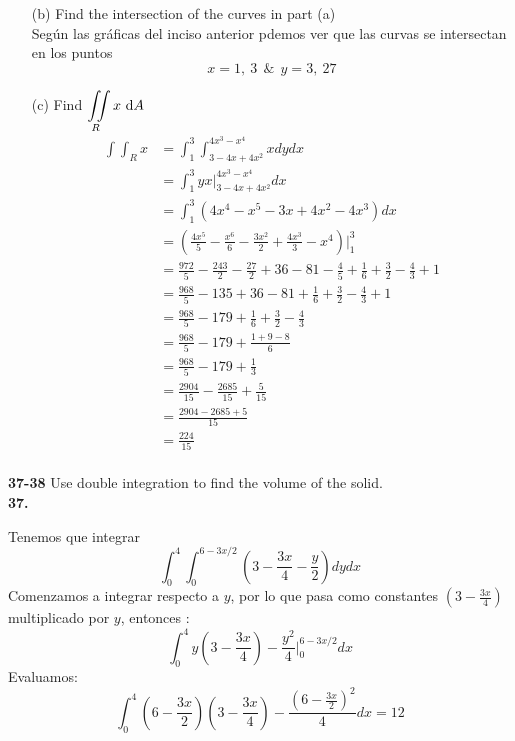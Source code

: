 \documentclass[11pt]{report}
\begin{document}
\begin{itemize}
	\item[(b)]{
		Find the intersection of the curves in part (a)\\
		Según las gráficas del inciso anterior pdemos ver que las curvas se intersectan
		en los puntos $$x=1,\ 3\ \ \&\ \ y=3,\ 27$$
	}
	\item[(c)]{
		Find $ {\displaystyle \iint \limits_R } \, x \, \, \text dA $ \\
		\begin{equation}
		\begin{split}
			\int\int_Rx &=\int_1^3\int_{3-4x+4x^2}^{4x^3-x^4}xdydx\\
				   	   &=\int_1^3yx\Big|_{3-4x+4x^2}^{4x^3-x^4}dx\\
					    &=\int_1^3 (4x^4-x^5-3x+4x^2-4x^3)dx\\
						&=(\tfrac{4x^5}{5}-\tfrac{x^6}{6}-\tfrac{3x^2}{2}+\tfrac{4x^3}{3}-x^4)\Big|_1^3\\
						&=\tfrac{972}{5}-\tfrac{243}{2}-\tfrac{27}{2}+36-81-\tfrac{4}{5}+\tfrac{1}{6}+\tfrac{3}{2}-\tfrac{4}{3}+1\\
						&=\tfrac{968}{5}-135+36-81+\tfrac{1}{6}+\tfrac{3}{2}-\tfrac{4}{3}+1\\
						&=\tfrac{968}{5}-179+\tfrac{1}{6}+\tfrac{3}{2}-\tfrac{4}{3}\\
						&=\tfrac{968}{5}-179+\tfrac{1+9-8}{6}\\
						&=\tfrac{968}{5}-179+\tfrac{1}{3}\\
						&=\tfrac{2904}{15}-\tfrac{2685}{15}+\tfrac{5}{15}\\
						&=\tfrac{2904-2685+5}{15}\\
						&=\tfrac{224}{15}\\
			\end{split}
		\end{equation}
	}

\end{itemize}

\textbf{37-38} Use double integration to find the volume of the solid. \\

\textbf{37.} \\

\begin{figure}[h]
\centering
\end{figure}

Tenemos que integrar
\[\int_0^4 \int_0^{6-3x/2}\left( 3- \frac{3x}{4}- \frac{y}{2} \right) dy dx\]
Comenzamos a integrar respecto a $y$, por lo que pasa como constantes $(3- \frac{3x}{4})$ multiplicado por $y$, entonces :
\[\int_0^4 y \left( 3- \frac{3x}{4}\right)- \frac{y^2}{4} \vert_0^{6-3x/2} dx\]
Evaluamos:
\[\int_0^4 \left(6 - \frac{3x}{2} \right)\left( 3- \frac{3x}{4}\right)- \frac{\left(6 - \frac{3x}{2} \right)^2}{4} dx = 12\]
\end{document}
